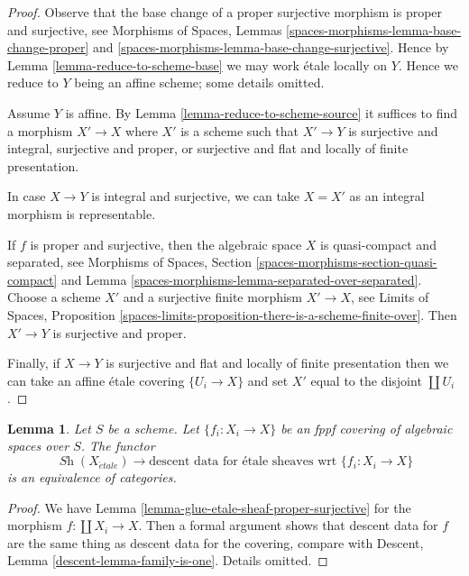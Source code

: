 \documentclass{stacks-project}
\theoremstyle{plain}
\newtheorem{lemma}[subsection]{Lemma}
\theoremstyle{definition}
\theoremstyle{remark}
\numberwithin{equation}{subsection}
\def\Sh{\mathop{\mathit{Sh}}\nolimits}
\def\etale{{\acute{e}tale}}
\begin{document}
\begin{proof}
Observe that the base change of a proper surjective morphism is
proper and surjective, see
Morphisms of Spaces, Lemmas \ref{spaces-morphisms-lemma-base-change-proper}
and \ref{spaces-morphisms-lemma-base-change-surjective}.
Hence by Lemma \ref{lemma-reduce-to-scheme-base}
we may work \'etale locally on $Y$. Hence
we reduce to $Y$ being an affine scheme; some details omitted.

\medskip\noindent
Assume $Y$ is affine. By Lemma \ref{lemma-reduce-to-scheme-source}
it suffices to find a morphism $X' \to X$ where $X'$ is a scheme such
that $X' \to Y$ is surjective and integral, surjective and proper, or
surjective and flat and locally of finite presentation.

\medskip\noindent
In case $X \to Y$ is integral and surjective, we can take $X = X'$
as an integral morphism is representable.

\medskip\noindent
If $f$ is proper and surjective, then the algebraic space
$X$ is quasi-compact and separated, see
Morphisms of Spaces, Section \ref{spaces-morphisms-section-quasi-compact} and
Lemma \ref{spaces-morphisms-lemma-separated-over-separated}.
Choose a scheme $X'$ and a surjective finite morphism $X' \to X$, see
Limits of Spaces, Proposition
\ref{spaces-limits-proposition-there-is-a-scheme-finite-over}.
Then $X' \to Y$ is surjective and proper.

\medskip\noindent
Finally, if $X \to Y$ is surjective and flat and locally of finite
presentation then we can take an affine \'etale covering $\{U_i \to X\}$
and set $X'$ equal to the disjoint $\coprod U_i$.
\end{proof}

\begin{lemma}
\label{lemma-glue-etale-sheaf-fppf}
Let $S$ be a scheme.
Let $\{f_i : X_i \to X\}$ be an fppf covering of algebraic spaces over $S$.
The functor
$$
\Sh(X_\etale)
\longrightarrow
\text{descent data for \'etale sheaves wrt }\{f_i : X_i \to X\}
$$
is an equivalence of categories.
\end{lemma}

\begin{proof}
We have Lemma \ref{lemma-glue-etale-sheaf-proper-surjective}
for the morphism $f : \coprod X_i \to X$.
Then a formal argument shows that descent data for $f$
are the same thing as descent data for the covering, compare
with Descent, Lemma \ref{descent-lemma-family-is-one}.
Details omitted.
\end{proof}
\end{document}
